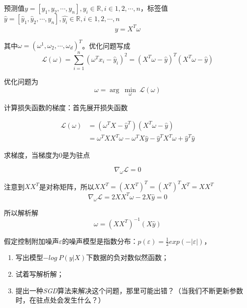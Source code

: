 预测值$y=[y_1,y_2,\cdots,y_n],y_i\in \mathbb{R},i\in 1,2,\cdots,n$，标签值$\hat{y}=[\hat{y}_1,\hat{y}_2,\cdots,\hat{y}_n],\hat{y_i}\in \mathbb{R},i\in 1,2,\cdots,n$
\begin{equation}
    y= X^T\omega
\end{equation}

其中$\omega=(\omega^1,\omega_2,\cdots,\omega_d)^T$。优化问题写成
\begin{equation}
    \mathcal{L}(\omega)=\sum_{i=1}^{n}(\omega^Tx_{i}-\hat{y}_i)^2=(X^T\omega -\hat{y})^T(X^T\omega-\hat{y})
\end{equation}

优化问题为
\begin{equation}
    \omega=\arg\ \min_{\omega}\ \mathcal{L}(\omega)
\end{equation}

计算损失函数的梯度：首先展开损失函数

\begin{equation}
    \begin{aligned}
        \mathcal{L}(\omega)&=(\omega^TX-\hat{y}^T)(X^T\omega-\hat{y})\\
        &=\omega^TXX^T\omega-\omega^TX\hat{y}-\hat{y}^TX^T\omega+\hat{y}^T\hat{y}
    \end{aligned}
\end{equation}

求梯度，当梯度为$0$是为驻点

\begin{equation}
    \nabla_\omega \mathcal{L}=0
\end{equation}

注意到$XX^T$是对称矩阵，所以$XX^T=(XX^T)^T=(X^T)^TX^T=XX^T$
\begin{equation}
    \nabla_\omega \mathcal{L}=2XX^T\omega-2X\hat{y}=0
\end{equation}

所以解析解
\begin{equation}
    \omega=(XX^T)^{-1}(X\hat{y})
\end{equation}

\begin{mdframed}
    \begin{question}
       假定控制附加噪声$\varepsilon$的噪声模型是指数分布：$p(\varepsilon)=\frac{1}{2}exp(-|\varepsilon|)$，
       \begin{enumerate}[itemindent=2em]
        \item 写出模型$-log\ P(y|X)$下数据的负对数似然函数；
        \item 试着写解析解；
        \item 提出一种\textsl{SGD}算法来解决这个问题，那里可能出错？（当我们不断更新参数时，在驻点处会发生什么？）
       \end{enumerate}
    \end{question}
\end{mdframed}

